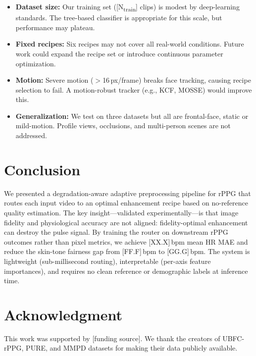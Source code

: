\documentclass[conference]{IEEEtran}
\begin{document}
\begin{itemize}
    \item \textbf{Dataset size:} Our training set ([N\textsubscript{train}] clips) is modest by deep-learning standards. The tree-based classifier is appropriate for this scale, but performance may plateau.
    \item \textbf{Fixed recipes:} Six recipes may not cover all real-world conditions. Future work could expand the recipe set or introduce continuous parameter optimization.
    \item \textbf{Motion:} Severe motion ($>$16\,px/frame) breaks face tracking, causing recipe selection to fail. A motion-robust tracker (e.g., KCF, MOSSE) would improve this.
    \item \textbf{Generalization:} We test on three datasets but all are frontal-face, static or mild-motion. Profile views, occlusions, and multi-person scenes are not addressed.
\end{itemize}

\section{Conclusion}
\label{sec:conclusion}

We presented a degradation-aware adaptive preprocessing pipeline for rPPG that routes each input video to an optimal enhancement recipe based on no-reference quality estimation. The key insight---validated experimentally---is that image fidelity and physiological accuracy are not aligned: fidelity-optimal enhancement can destroy the pulse signal. By training the router on downstream rPPG outcomes rather than pixel metrics, we achieve [XX.X]\,bpm mean HR MAE and reduce the skin-tone fairness gap from [FF.F]\,bpm to [GG.G]\,bpm. The system is lightweight (sub-millisecond routing), interpretable (per-axis feature importances), and requires no clean reference or demographic labels at inference time.

\section*{Acknowledgment}

This work was supported by [funding source]. We thank the creators of UBFC-rPPG, PURE, and MMPD datasets for making their data publicly available.
\end{document}
